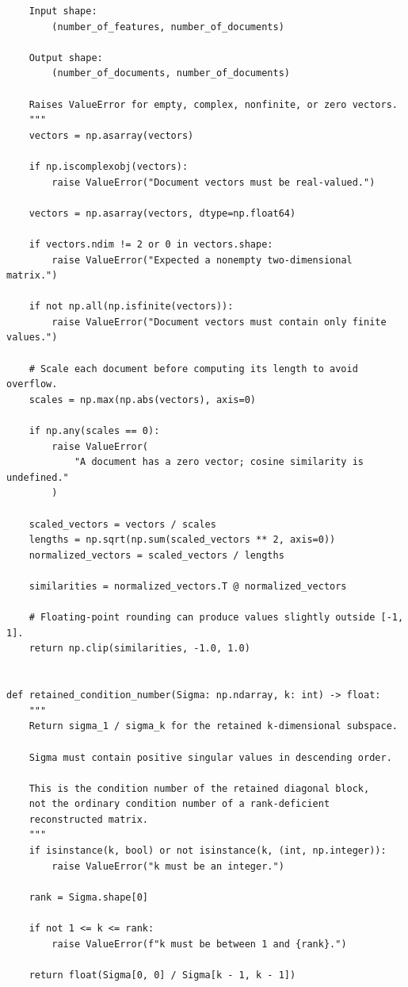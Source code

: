 \documentclass[12pt,a4paper]{report}
\theoremstyle{plain}
\theoremstyle{definition}
\theoremstyle{remark}
\theoremstyle{definition}
\begin{document}
\begin{lstlisting}
    Input shape:
        (number_of_features, number_of_documents)

    Output shape:
        (number_of_documents, number_of_documents)

    Raises ValueError for empty, complex, nonfinite, or zero vectors.
    """
    vectors = np.asarray(vectors)

    if np.iscomplexobj(vectors):
        raise ValueError("Document vectors must be real-valued.")

    vectors = np.asarray(vectors, dtype=np.float64)

    if vectors.ndim != 2 or 0 in vectors.shape:
        raise ValueError("Expected a nonempty two-dimensional matrix.")

    if not np.all(np.isfinite(vectors)):
        raise ValueError("Document vectors must contain only finite values.")

    # Scale each document before computing its length to avoid overflow.
    scales = np.max(np.abs(vectors), axis=0)

    if np.any(scales == 0):
        raise ValueError(
            "A document has a zero vector; cosine similarity is undefined."
        )

    scaled_vectors = vectors / scales
    lengths = np.sqrt(np.sum(scaled_vectors ** 2, axis=0))
    normalized_vectors = scaled_vectors / lengths

    similarities = normalized_vectors.T @ normalized_vectors

    # Floating-point rounding can produce values slightly outside [-1, 1].
    return np.clip(similarities, -1.0, 1.0)


def retained_condition_number(Sigma: np.ndarray, k: int) -> float:
    """
    Return sigma_1 / sigma_k for the retained k-dimensional subspace.

    Sigma must contain positive singular values in descending order.

    This is the condition number of the retained diagonal block,
    not the ordinary condition number of a rank-deficient
    reconstructed matrix.
    """
    if isinstance(k, bool) or not isinstance(k, (int, np.integer)):
        raise ValueError("k must be an integer.")

    rank = Sigma.shape[0]

    if not 1 <= k <= rank:
        raise ValueError(f"k must be between 1 and {rank}.")

    return float(Sigma[0, 0] / Sigma[k - 1, k - 1])
\end{lstlisting}
\end{document}
